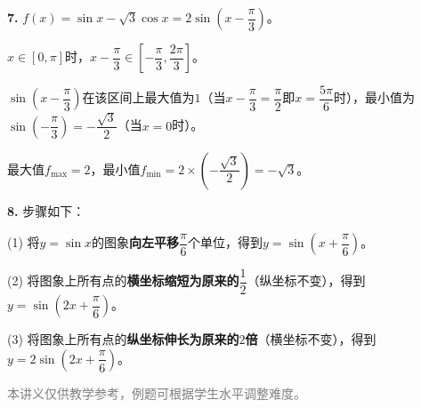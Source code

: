 \documentclass[12pt, a4paper]{ctexart}
\begin{document}
\begin{knowledgebox}[参考答案]
\medskip

\textbf{7.} $f(x)=\sin x-\sqrt{3}\cos x=2\sin\!\left(x-\dfrac{\pi}{3}\right)$。

$x\in[0,\pi]$时，$x-\dfrac{\pi}{3}\in\left[-\dfrac{\pi}{3},\dfrac{2\pi}{3}\right]$。

$\sin\!\left(x-\dfrac{\pi}{3}\right)$在该区间上最大值为$1$（当$x-\dfrac{\pi}{3}=\dfrac{\pi}{2}$即$x=\dfrac{5\pi}{6}$时），最小值为$\sin\!\left(-\dfrac{\pi}{3}\right)=-\dfrac{\sqrt{3}}{2}$（当$x=0$时）。

最大值$f_{\max}=2$，最小值$f_{\min}=2\times\left(-\dfrac{\sqrt{3}}{2}\right)=-\sqrt{3}$。

\medskip

\textbf{8.} 步骤如下：

(1) 将$y=\sin x$的图象\textbf{向左平移}$\dfrac{\pi}{6}$个单位，得到$y=\sin\!\left(x+\dfrac{\pi}{6}\right)$。

(2) 将图象上所有点的\textbf{横坐标缩短为原来的}$\dfrac{1}{2}$（纵坐标不变），得到$y=\sin\!\left(2x+\dfrac{\pi}{6}\right)$。

(3) 将图象上所有点的\textbf{纵坐标伸长为原来的$2$倍}（横坐标不变），得到$y=2\sin\!\left(2x+\dfrac{\pi}{6}\right)$。

\end{knowledgebox}

\vfill
\begin{center}
\small\textcolor{gray}{本讲义仅供教学参考，例题可根据学生水平调整难度。}
\end{center}
\end{document}
